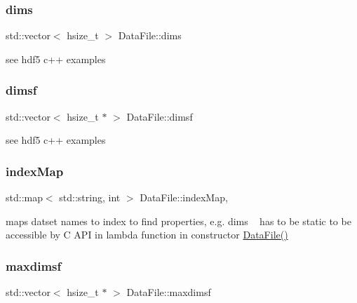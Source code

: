 \subsubsection{\texorpdfstring{dims}{dims}}
{\footnotesize\ttfamily std\+::vector$<$ hsize\+\_\+t $>$ Data\+File\+::dims\hspace{0.3cm}{\ttfamily [private]}}

see hdf5 c++ examples \mbox{\label{classDataFile_a93dc46888578ba19d25940638904c678}} 
\subsubsection{\texorpdfstring{dimsf}{dimsf}}
{\footnotesize\ttfamily std\+::vector$<$ hsize\+\_\+t $\ast$ $>$ Data\+File\+::dimsf\hspace{0.3cm}{\ttfamily [private]}}

see hdf5 c++ examples \mbox{\label{classDataFile_ab08fca1e2ac3355f2279faf37054ddfc}} 
\subsubsection{\texorpdfstring{index\+Map}{indexMap}}
{\footnotesize\ttfamily std\+::map$<$ std\+::string, int $>$ Data\+File\+::index\+Map\hspace{0.3cm}{\ttfamily [static]}, {\ttfamily [private]}}

maps datset names to index to find properties, e.\+g. dims ~\newline
 has to be static to be accessible by C A\+PI in lambda function in constructor \hyperlink{classDataFile_a506afaa3e498c06d841cfd2166724add}{Data\+File()} \mbox{\label{classDataFile_a60c9e3ae1cf557b5a396754c203a08c7}} 
\subsubsection{\texorpdfstring{maxdimsf}{maxdimsf}}
{\footnotesize\ttfamily std\+::vector$<$ hsize\+\_\+t $\ast$ $>$ Data\+File\+::maxdimsf\hspace{0.3cm}{\ttfamily [private]}}

